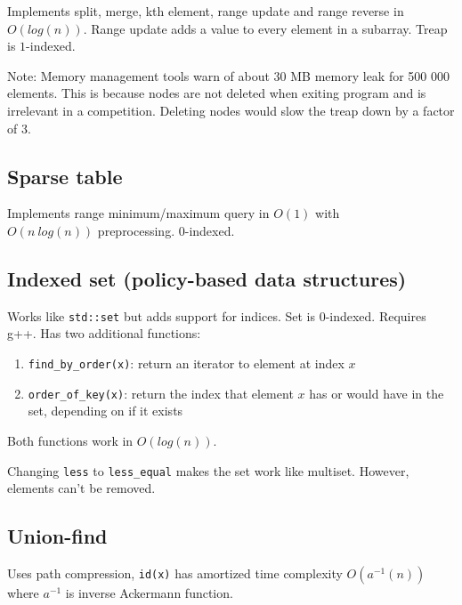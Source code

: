 \documentclass{article}
\begin{document}
Implements split, merge, kth element, range update and range reverse in $O(log(n))$. Range update adds a value to every element in a subarray. Treap is $1$-indexed.

Note: Memory management tools warn of about 30 MB memory leak for 500 000 elements. This is because nodes are not deleted when exiting program and is irrelevant in a competition. Deleting nodes would slow the treap down by a factor of 3.



\subsection {Sparse table}

Implements range minimum/maximum query in $O(1)$ with \\ $O(n \ log(n))$ preprocessing. $0$-indexed.



\subsection {Indexed set (policy-based data structures)}

Works like \texttt{std::set} but adds support for indices. Set is 0-indexed. Requires g++. Has two additional functions:

\begin{enumerate}
	\item \verb|find_by_order(x)|: return an iterator to element at index $x$
	\item \verb|order_of_key(x)|: return the index that element $x$ has or would have in the set, depending on if it exists
\end{enumerate}

Both functions work in $O(log(n))$.

Changing \texttt{less} to \verb|less_equal| makes the set work like multiset. However, elements can't be removed.



\subsection{Union-find}

Uses path compression, \texttt{id(x)} has amortized time complexity $O(a^{-1}(n))$ where $a^{-1}$ is inverse Ackermann function.
\end{document}
